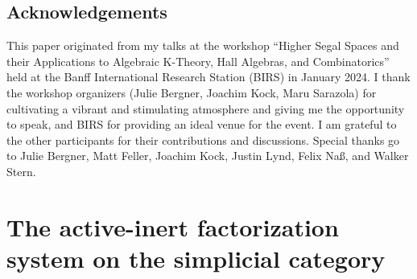 \documentclass{amsart}
\theoremstyle{definition}
\theoremstyle{remark}
\begin{document}
\subsection*{Acknowledgements}
This paper originated from my talks at the workshop ``Higher Segal Spaces and their Applications to Algebraic K-Theory, Hall Algebras, and Combinatorics'' held at the Banff International Research Station (BIRS) in January 2024.
I thank the workshop organizers (Julie Bergner, Joachim Kock, Maru Sarazola) for cultivating a vibrant and stimulating atmosphere and giving me the opportunity to speak, and BIRS for providing an ideal venue for the event.
I am grateful to the other participants for their contributions and discussions.
Special thanks go to Julie Bergner, Matt Feller, Joachim Kock, Justin Lynd, Felix Naß, and Walker Stern.

\section{The active-inert factorization system on the simplicial category}\label{sec act inert fact}
\end{document}
